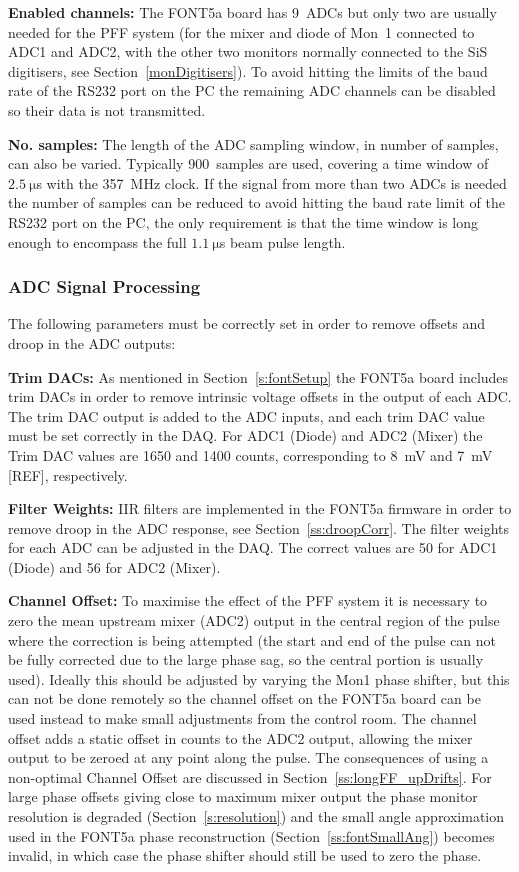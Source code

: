 \textbf{Enabled channels:} The FONT5a board has 9~ADCs but only two are usually needed for the PFF system (for the mixer and diode of Mon~1 connected to ADC1 and ADC2, with the other two monitors normally connected to the SiS digitisers, see Section~\ref{monDigitisers}). To avoid hitting the limits of the baud rate  of the RS232 port on the PC the remaining ADC channels can be disabled so their data is not transmitted.

\textbf{No. samples:} The length of the ADC sampling window, in number of samples, can also be varied. Typically 900~samples are used, covering a time window of \(2.5~\mathrm{\mu}\)s with the 357~MHz clock. If the signal from more than two ADCs is needed the number of samples can be reduced to avoid hitting the baud rate limit of the RS232 port on the PC, the only requirement is that the time window is long enough to encompass the full \(1.1~\mathrm{\mu}\)s beam pulse length.

\subsubsection{ADC Signal Processing}

The following parameters must be correctly set in order to remove offsets and droop in the ADC outputs:

\textbf{Trim DACs:} As mentioned in Section~\ref{s:fontSetup} the FONT5a board includes trim DACs in order to remove intrinsic voltage offsets in the output of each ADC. The trim DAC output is added to the ADC inputs, and each trim DAC value must be set correctly in the DAQ. For ADC1 (Diode) and ADC2 (Mixer) the Trim DAC values are 1650 and 1400 counts, corresponding to 8~mV and 7~mV [REF], respectively.

\textbf{Filter Weights:} IIR filters are implemented in the FONT5a firmware in order to remove droop in the ADC response, see Section~\ref{ss:droopCorr}. The filter weights for each ADC can be adjusted in the DAQ. The correct values are 50 for ADC1 (Diode) and 56 for ADC2 (Mixer).

\textbf{Channel Offset:} To maximise the effect of the PFF system it is necessary to zero the mean upstream mixer (ADC2) output in the central region of the pulse where the correction is being attempted (the start and end of the pulse can not be fully corrected due to the large phase sag, so the central portion is usually used). Ideally this should be adjusted by varying the Mon1 phase shifter, but this can not be done remotely so the channel offset on the FONT5a board can be used instead to make small adjustments from the control room. The channel offset adds a static offset in counts to the ADC2 output, allowing the mixer output to be zeroed at any point along the pulse. The consequences of using a non-optimal Channel Offset are discussed in Section~\ref{ss:longFF_upDrifts}. For large phase offsets giving close to maximum mixer output the phase monitor resolution is degraded (Section~\ref{s:resolution}) and the small angle approximation used in the FONT5a phase reconstruction (Section~\ref{ss:fontSmallAng}) becomes invalid, in which case the phase shifter should still be used to zero the phase. 

